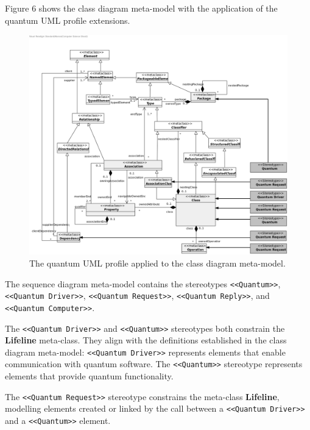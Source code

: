 \documentclass{article}
\newcounter{subsubsubsection}[subsubsection]
\begin{document}
Figure 6 shows the class diagram meta-model with the application of the quantum UML profile extensions.

\begin{figure}
    \centering
    \includegraphics[width=1\linewidth]{QuantumUMLProfile-ClassDiagram.png}
    \caption{The quantum UML profile applied to the class diagram meta-model\cite{PerezCastillo2021Git}.}
    \label{fig:QUMLPD_CD}
\end{figure}


The sequence diagram meta-model contains the stereotypes \texttt{<<Quantum>>},\\ \texttt{<<Quantum Driver>>}, \texttt{<<Quantum Request>>}, \texttt{<<Quantum Reply>>}, and\\ \texttt{<<Quantum Computer>>}.

The \texttt{<<Quantum Driver>>} and \texttt{<<Quantum>>} stereotypes both constrain the \textbf{Lifeline} meta-class. They align with the definitions established in the class diagram meta-model: \texttt{<<Quantum Driver>>} represents elements that enable communication with quantum software. The \texttt{<<Quantum>>} stereotype represents elements that provide quantum functionality.

The \texttt{<<Quantum Request>>} stereotype constrains the meta-class \textbf{Lifeline}, modelling elements created or linked by the call between a \texttt{<<Quantum Driver>>} and a \texttt{<<Quantum>>} element\cite{Pérez-Castillo2022}.
\end{document}

